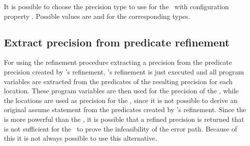 It is possible to choose the precision type to use for the \constraintsCPA\ with configuration property .
Possible values are  and  for the corresponding types.

\subsection{Extract precision from predicate refinement}
For using the refinement procedure extracting a precision from the predicate precision created by \predicateCPA's refinement, \predicateCPA's refinement is just executed
and all program variables are extracted from the predicates of the resulting precision for each location.
These program variables are then used for the precision of the , while the locations are used as precision for the \constraintsCPA, since it is not possible to derive an original assume statement from the predicates created by \predicateCPA's refinement.
Since the \predicateCPA is more powerful than the \symbolicExecutionCPA, it is possible that a refined precision is returned that is not sufficient for the \symbolicExecutionCPA\ to prove the infeasibility of the error path.
Because of this it is not always possible to use this alternative.
